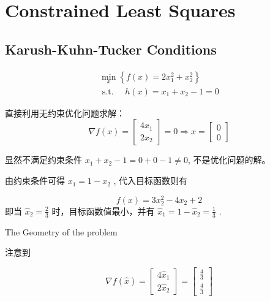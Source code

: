 \chapter{Constrained Least Squares}

\section{Karush-Kuhn-Tucker Conditions}

\begin{problem}
    \begin{equation}
\begin{array}{l}
\min _{x}\left\{f(x)=2 x_{1}^{2}+x_{2}^{2}\right\} \\
\text { s.t. } \quad h(x)=x_{1}+x_{2}-1=0
\end{array}
\end{equation}

直接利用无约束优化问题求解： 
\begin{equation} \nabla f(x)=\left[\begin{array}{l}4 x_{1} \\ 2 x_{2}\end{array}\right]=0 \Rightarrow x=\left[\begin{array}{l}0 \\ 0\end{array}\right] \end{equation}

显然不满足约束条件 $ x_{1}+x_{2}-1=0+0-1 \neq 0 $, 不是优化问题的解。
\end{problem}

由约束条件可得 $ x_{1}=1-x_{2} $ , 代入目标函数则有

\begin{equation} f(x)=3 x_{2}^{2}-4 x_{2}+2 \end{equation}
即当 $ \hat{x}_{2}=\frac{2}{3} $ 时，目标函数值最小，并有 $ \hat{x}_{1}=1-\hat{x}_{2}=\frac{1}{3} $ .

\begin{FigureCenter}{The Geometry of the problem}
    \label{fig:geometry-of-the-problem}
    
\end{FigureCenter}

注意到

$$ \nabla f(\hat{x})=\left[\begin{array}{l}4 \hat{x}_{1} \\ 2 \hat{x}_{2}\end{array}\right]=\left[\begin{array}{l}\frac{4}{3} \\ \frac{4}{3}\end{array}\right] $$

